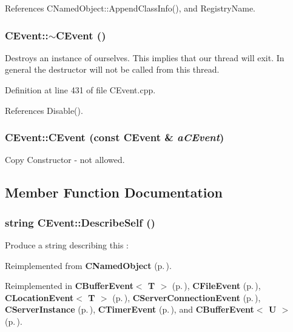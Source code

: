 References CNamed\-Object::Append\-Class\-Info(), and Registry\-Name.
\subsubsection{\setlength{\rightskip}{0pt plus 5cm}CEvent::$\sim$CEvent ()\hspace{0.3cm}{\tt  [virtual]}}\label{classCEvent_a3}


Destroys an instance of ourselves. This implies that our thread will exit. In general the destructor will not be called from this thread. 

Definition at line 431 of file CEvent.cpp.

References Disable().
\subsubsection{\setlength{\rightskip}{0pt plus 5cm}CEvent::CEvent (const CEvent \& {\em a\-CEvent})\hspace{0.3cm}{\tt  [private]}}\label{classCEvent_c0}


Copy Constructor - not allowed.



\subsection{Member Function Documentation}
\subsubsection{\setlength{\rightskip}{0pt plus 5cm}string CEvent::Describe\-Self ()\hspace{0.3cm}{\tt  [virtual]}}\label{classCEvent_a16}


Produce a string describing this : 

Reimplemented from {\bf CNamed\-Object} {\rm (p.\,\pageref{classCNamedObject_a8})}.

Reimplemented in {\bf CBuffer\-Event$<$ T $>$} {\rm (p.\,\pageref{classCBufferEvent_a14})}, {\bf CFile\-Event} {\rm (p.\,\pageref{classCFileEvent_a19})}, {\bf CLocation\-Event$<$ T $>$} {\rm (p.\,\pageref{classCLocationEvent_a10})}, {\bf CServer\-Connection\-Event} {\rm (p.\,\pageref{classCServerConnectionEvent_a14})}, {\bf CServer\-Instance} {\rm (p.\,\pageref{classCServerInstance_a11})}, {\bf CTimer\-Event} {\rm (p.\,\pageref{classCTimerEvent_a12})}, and {\bf CBuffer\-Event$<$ U $>$} {\rm (p.\,\pageref{classCBufferEvent_a14})}.

